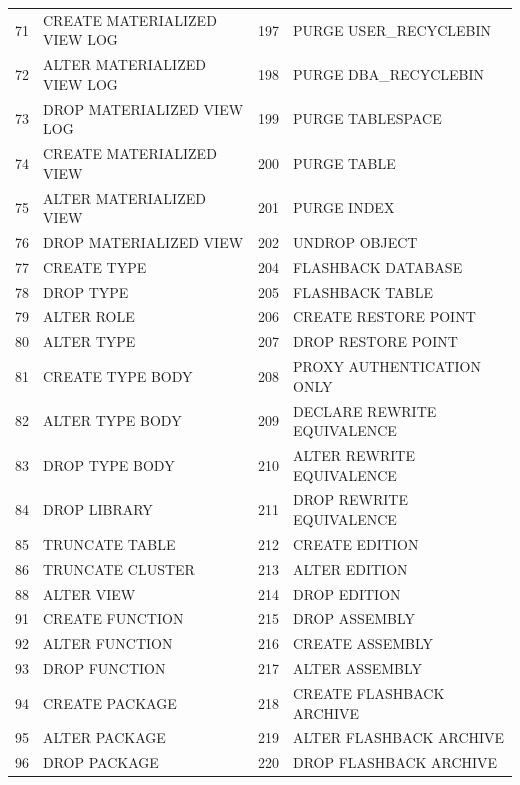 \begin{appendix}
\begin{longtable}[]{@{}rl|rl@{}}
71   & CREATE MATERIALIZED VIEW LOG & 197 & PURGE USER\_RECYCLEBIN       \\
72   & ALTER MATERIALIZED VIEW LOG  & 198 & PURGE DBA\_RECYCLEBIN        \\
73   & DROP MATERIALIZED VIEW LOG   & 199 & PURGE TABLESPACE             \\
74   & CREATE MATERIALIZED VIEW     & 200 & PURGE TABLE                  \\
75   & ALTER MATERIALIZED VIEW      & 201 & PURGE INDEX                  \\
76   & DROP MATERIALIZED VIEW       & 202 & UNDROP OBJECT                \\
77   & CREATE TYPE                  & 204 & FLASHBACK DATABASE           \\
78   & DROP TYPE                    & 205 & FLASHBACK TABLE              \\
79   & ALTER ROLE                   & 206 & CREATE RESTORE POINT         \\
80   & ALTER TYPE                   & 207 & DROP RESTORE POINT           \\
81   & CREATE TYPE BODY             & 208 & PROXY AUTHENTICATION ONLY    \\
82   & ALTER TYPE BODY              & 209 & DECLARE REWRITE EQUIVALENCE  \\
83   & DROP TYPE BODY               & 210 & ALTER REWRITE EQUIVALENCE    \\
84   & DROP LIBRARY                 & 211 & DROP REWRITE EQUIVALENCE     \\
85   & TRUNCATE TABLE               & 212 & CREATE EDITION               \\
86   & TRUNCATE CLUSTER             & 213 & ALTER EDITION                \\
88   & ALTER VIEW                   & 214 & DROP EDITION                 \\
91   & CREATE FUNCTION              & 215 & DROP ASSEMBLY                \\
92   & ALTER FUNCTION               & 216 & CREATE ASSEMBLY              \\
93   & DROP FUNCTION                & 217 & ALTER ASSEMBLY               \\
94   & CREATE PACKAGE               & 218 & CREATE FLASHBACK ARCHIVE     \\
95   & ALTER PACKAGE                & 219 & ALTER FLASHBACK ARCHIVE      \\
96   & DROP PACKAGE                 & 220 & DROP FLASHBACK ARCHIVE       \\

\end{longtable}
\end{appendix}
